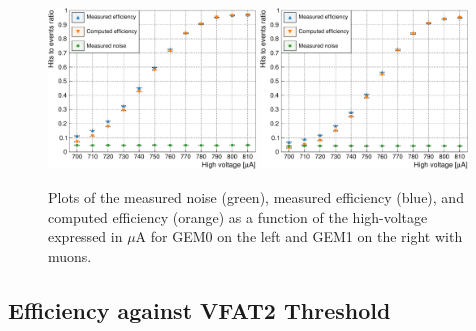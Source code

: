       \begin{figure}[h!]
        \centering
        \includegraphics[width=0.49\textwidth]{img/plots/cEfficiency_HV_GEM0-crop}
        \includegraphics[width=0.49\textwidth]{img/plots/cEfficiency_HV_GEM1-crop}
        \caption{Plots of the measured noise (green), measured efficiency (blue), and computed efficiency (orange) as a function of the high-voltage expressed in $\mu$A for GEM0 on the left and GEM1 on the right with muons.}
        \label{fig:II-3-data-eff-hv}
      \end{figure}

    \subsection{Efficiency against VFAT2 Threshold}

